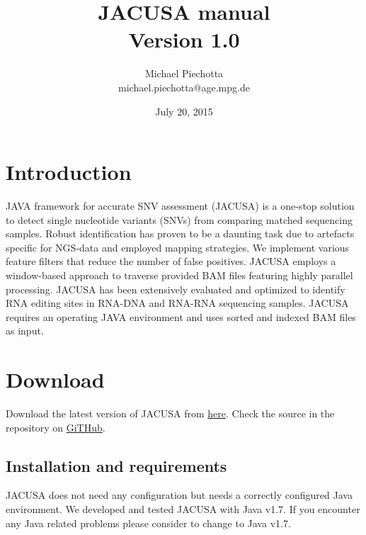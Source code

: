 \documentclass[10pt, a4paper]{article}
\title{JACUSA manual \\ Version 1.0}
\author{Michael Piechotta \\ michael.piechotta@age.mpg.de}
\date{July 20, 2015}
\begin{document}
\maketitle \tableofcontents
\section{Introduction}
JAVA framework for accurate SNV assessment (JACUSA) is a one-stop solution to detect single
nucleotide variants (SNVs) from comparing matched sequencing samples. Robust identification has
proven to be a daunting task due to artefacts specific for NGS-data and employed mapping
strategies. We implement various feature filters that reduce the number of false positives. JACUSA
employs a window-based approach to traverse provided BAM files featuring highly parallel processing.
JACUSA has been extensively evaluated and optimized to identify RNA editing sites in RNA-DNA and
RNA-RNA sequencing samples. JACUSA requires an operating JAVA environment and uses sorted and
indexed BAM files as input.
\section{Download}
Download the latest version of JACUSA from \href{http://www.age.mpg.de/software/jacusa/latest.tar.gz}{here}.
Check the source in the repository on
\href{https://github.com/dieterich-lab/JACUSA}{GiTHub}.
\subsection{Installation and requirements}
JACUSA does not need any configuration but needs a correctly configured Java environment.
We developed and tested JACUSA with Java v1.7. If you encounter any Java related problems please
consider to change to Java v1.7.
\end{document}
